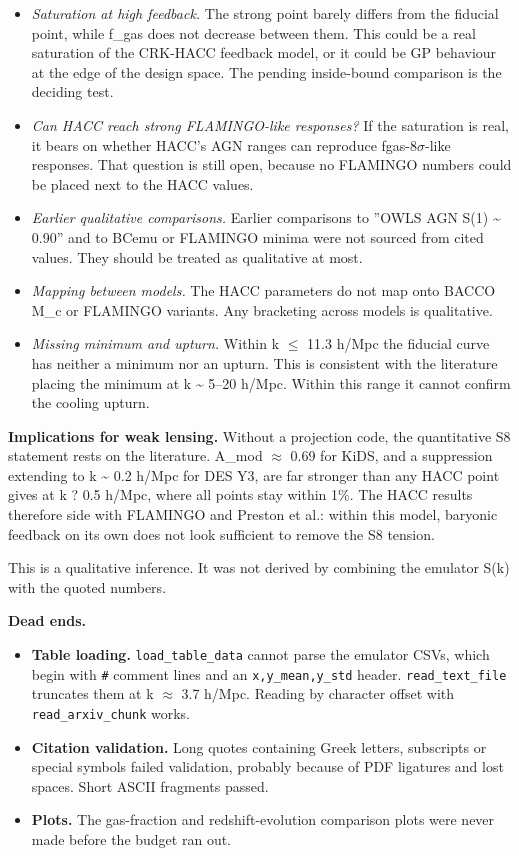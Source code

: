 \documentclass[11pt,a4paper]{article}
\begin{document}
\begin{itemize}
  \item \textit{Saturation at high feedback.} The strong point barely differs from the fiducial point, while f\_gas does not decrease between them. This could be a real saturation of the CRK-HACC feedback model, or it could be GP behaviour at the edge of the design space. The pending inside-bound comparison is the deciding test.
  \item \textit{Can HACC reach strong FLAMINGO-like responses?} If the saturation is real, it bears on whether HACC's AGN ranges can reproduce fgas-8$\sigma$-like responses. That question is still open, because no FLAMINGO numbers could be placed next to the HACC values.
  \item \textit{Earlier qualitative comparisons.} Earlier comparisons to ''OWLS AGN S(1) \textasciitilde{} 0.90'' and to BCemu or FLAMINGO minima were not sourced from cited values. They should be treated as qualitative at most.
  \item \textit{Mapping between models.} The HACC parameters do not map onto BACCO M\_c or FLAMINGO variants. Any bracketing across models is qualitative.
  \item \textit{Missing minimum and upturn.} Within k $\leq$ 11.3 h/Mpc the fiducial curve has neither a minimum nor an upturn. This is consistent with the literature placing the minimum at k \textasciitilde{} 5--20 h/Mpc. Within this range it cannot confirm the cooling upturn.
\end{itemize}
\textbf{Implications for weak lensing.} Without a projection code, the quantitative S8 statement rests on the literature. A\_mod $\approx$ 0.69 for KiDS, and a suppression extending to k \textasciitilde{} 0.2 h/Mpc for DES Y3, are far stronger than any HACC point gives at k ? 0.5 h/Mpc, where all points stay within 1\%. The HACC results therefore side with FLAMINGO and Preston et al.: within this model, baryonic feedback on its own does not look sufficient to remove the S8 tension.

This is a qualitative inference. It was not derived by combining the emulator S(k) with the quoted numbers.

\textbf{Dead ends.}

\begin{itemize}
  \item \textbf{Table loading.} \texttt{load\_\allowbreak{}table\_\allowbreak{}data} cannot parse the emulator CSVs, which begin with \texttt{\#} comment lines and an \texttt{x,\allowbreak{}y\_\allowbreak{}mean,\allowbreak{}y\_\allowbreak{}std} header. \texttt{read\_\allowbreak{}text\_\allowbreak{}file} truncates them at k $\approx$ 3.7 h/Mpc. Reading by character offset with \texttt{read\_\allowbreak{}arxiv\_\allowbreak{}chunk} works.
  \item \textbf{Citation validation.} Long quotes containing Greek letters, subscripts or special symbols failed validation, probably because of PDF ligatures and lost spaces. Short ASCII fragments passed.
  \item \textbf{Plots.} The gas-fraction and redshift-evolution comparison plots were never made before the budget ran out.
\end{itemize}
\end{document}
